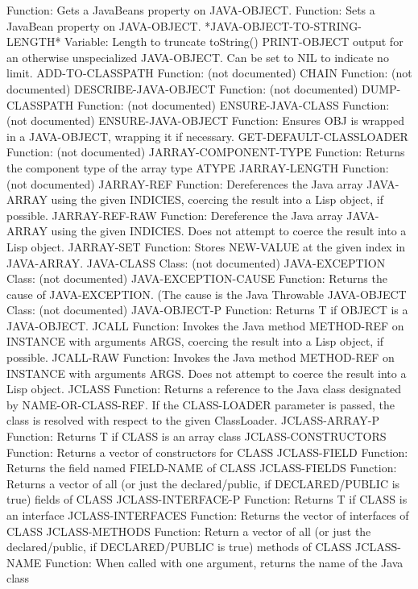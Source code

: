   Function: Gets a JavaBeans property on JAVA-OBJECT.
  Function: Sets a JavaBean property on JAVA-OBJECT.
*JAVA-OBJECT-TO-STRING-LENGTH*
  Variable: Length to truncate toString() PRINT-OBJECT output for an otherwise unspecialized JAVA-OBJECT.  Can be set to NIL to indicate no limit.
ADD-TO-CLASSPATH
  Function: (not documented)
CHAIN
  Function: (not documented)
DESCRIBE-JAVA-OBJECT
  Function: (not documented)
DUMP-CLASSPATH
  Function: (not documented)
ENSURE-JAVA-CLASS
  Function: (not documented)
ENSURE-JAVA-OBJECT
  Function: Ensures OBJ is wrapped in a JAVA-OBJECT, wrapping it if necessary.
GET-DEFAULT-CLASSLOADER
  Function: (not documented)
JARRAY-COMPONENT-TYPE
  Function: Returns the component type of the array type ATYPE
JARRAY-LENGTH
  Function: (not documented)
JARRAY-REF
  Function: Dereferences the Java array JAVA-ARRAY using the given INDICIES, coercing the result into a Lisp object, if possible.
JARRAY-REF-RAW
  Function: Dereference the Java array JAVA-ARRAY using the given INDICIES. Does not attempt to coerce the result into a Lisp object.
JARRAY-SET
  Function: Stores NEW-VALUE at the given index in JAVA-ARRAY.
JAVA-CLASS
  Class: (not documented)
JAVA-EXCEPTION
  Class: (not documented)
JAVA-EXCEPTION-CAUSE
  Function: Returns the cause of JAVA-EXCEPTION. (The cause is the Java Throwable
JAVA-OBJECT
  Class: (not documented)
JAVA-OBJECT-P
  Function: Returns T if OBJECT is a JAVA-OBJECT.
JCALL
  Function: Invokes the Java method METHOD-REF on INSTANCE with arguments ARGS, coercing the result into a Lisp object, if possible.
JCALL-RAW
  Function: Invokes the Java method METHOD-REF on INSTANCE with arguments ARGS. Does not attempt to coerce the result into a Lisp object.
JCLASS
  Function: Returns a reference to the Java class designated by NAME-OR-CLASS-REF. If the CLASS-LOADER parameter is passed, the class is resolved with respect to the given ClassLoader.
JCLASS-ARRAY-P
  Function: Returns T if CLASS is an array class
JCLASS-CONSTRUCTORS
  Function: Returns a vector of constructors for CLASS
JCLASS-FIELD
  Function: Returns the field named FIELD-NAME of CLASS
JCLASS-FIELDS
  Function: Returns a vector of all (or just the declared/public, if DECLARED/PUBLIC is true) fields of CLASS
JCLASS-INTERFACE-P
  Function: Returns T if CLASS is an interface
JCLASS-INTERFACES
  Function: Returns the vector of interfaces of CLASS
JCLASS-METHODS
  Function: Return a vector of all (or just the declared/public, if DECLARED/PUBLIC is true) methods of CLASS
JCLASS-NAME
  Function: When called with one argument, returns the name of the Java class
